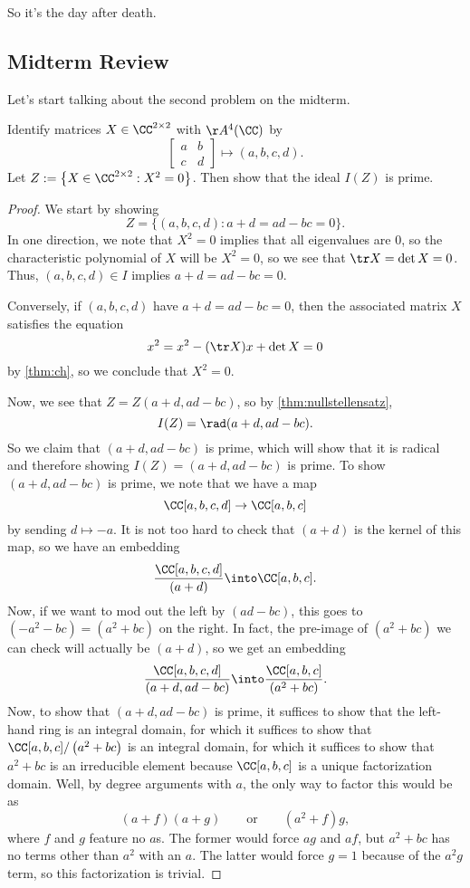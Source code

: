 
So it's the day after death.

\subsection{Midterm Review}
Let's start talking about the second problem on the midterm.
\begin{exe}
	Identify matrices $X\in\CC^{2\times2}$ with $\AA^4(\CC)$ by
	\[\begin{bmatrix}
		a & b \\
		c & d
	\end{bmatrix}\mapsto(a,b,c,d).\]
	Let $Z:=\left\{X\in\CC^{2\times2}:X^2=0\right\}$. Then show that the ideal $I(Z)$ is prime.
\end{exe}
\begin{proof}
	We start by showing
	\[Z=\{(a,b,c,d):a+d=ad-bc=0\}.\]
	In one direction, we note that $X^2=0$ implies that all eigenvalues are $0$, so the characteristic polynomial of $X$ will be $X^2=0$, so we see that $\tr X=\det X=0$. Thus, $(a,b,c,d)\in I$ implies $a+d=ad-bc=0$.

	Conversely, if $(a,b,c,d)$ have $a+d=ad-bc=0$, then the associated matrix $X$ satisfies the equation
	\[x^2=x^2-(\tr X)x+\det X=0\]
	by \autoref{thm:ch}, so we conclude that $X^2=0$.

	Now, we see that $Z=Z(a+d,ad-bc)$, so by \autoref{thm:nullstellensatz},
	\[I(Z)=\rad(a+d,ad-bc).\]
	So we claim that $(a+d,ad-bc)$ is prime, which will show that it is radical and therefore showing $I(Z)=(a+d,ad-bc)$ is prime. To show $(a+d,ad-bc)$ is prime, we note that we have a map
	\[\CC[a,b,c,d]\to\CC[a,b,c]\]
	by sending $d\mapsto-a$. It is not too hard to check that $(a+d)$ is the kernel of this map, so we have an embedding
	\[\frac{\CC[a,b,c,d]}{(a+d)}\into\CC[a,b,c].\]
	Now, if we want to mod out the left by $(ad-bc)$, this goes to $\left(-a^2-bc\right)=\left(a^2+bc\right)$ on the right. In fact, the pre-image of $\left(a^2+bc\right)$ we can check will actually be $(a+d)$, so we get an embedding
	\[\frac{\CC[a,b,c,d]}{(a+d,ad-bc)}\into\frac{\CC[a,b,c]}{\left(a^2+bc\right)}.\]
	Now, to show that $(a+d,ad-bc)$ is prime, it suffices to show that the left-hand ring is an integral domain, for which it suffices to show that $\CC[a,b,c]/\left(a^2+bc\right)$ is an integral domain, for which it suffices to show that $a^2+bc$ is an irreducible element because $\CC[a,b,c]$ is a unique factorization domain. Well, by degree arguments with $a$, the only way to factor this would be as
	\[(a+f)(a+g)\qquad\text{or}\qquad\left(a^2+f\right)g,\]
	where $f$ and $g$ feature no $a$s. The former would force $ag$ and $af$, but $a^2+bc$ has no terms other than $a^2$ with an $a$. The latter would force $g=1$ because of the $a^2g$ term, so this factorization is trivial.
\end{proof}

